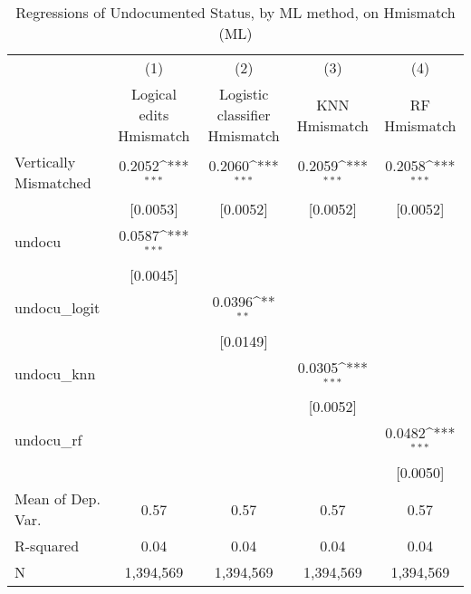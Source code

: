 \begin{table}[htbp]\centering
\def\sym#1{\ifmmode^{#1}\else\(^{#1}\)\fi}
\caption{Regressions of Undocumented Status, by ML method, on Hmismatch (ML)}
\begin{tabular}{l*{4}{c}}
\toprule
                    &\multicolumn{1}{c}{(1)}         &\multicolumn{1}{c}{(2)}         &\multicolumn{1}{c}{(3)}         &\multicolumn{1}{c}{(4)}         \\
                    &Logical edits Hmismatch         &Logistic classifier Hmismatch         &KNN Hmismatch         &RF Hmismatch         \\
\midrule
Vertically Mismatched&      0.2052\sym{***}&      0.2060\sym{***}&      0.2059\sym{***}&      0.2058\sym{***}\\
                    &    [0.0053]         &    [0.0052]         &    [0.0052]         &    [0.0052]         \\
\addlinespace
undocu              &      0.0587\sym{***}&                     &                     &                     \\
                    &    [0.0045]         &                     &                     &                     \\
\addlinespace
undocu\_logit        &                     &      0.0396\sym{**} &                     &                     \\
                    &                     &    [0.0149]         &                     &                     \\
\addlinespace
undocu\_knn          &                     &                     &      0.0305\sym{***}&                     \\
                    &                     &                     &    [0.0052]         &                     \\
\addlinespace
undocu\_rf           &                     &                     &                     &      0.0482\sym{***}\\
                    &                     &                     &                     &    [0.0050]         \\
\midrule
Mean of Dep. Var.   &        0.57         &        0.57         &        0.57         &        0.57         \\
R-squared           &        0.04         &        0.04         &        0.04         &        0.04         \\
N                   &   1,394,569         &   1,394,569         &   1,394,569         &   1,394,569         \\

\end{tabular}
\end{table}
